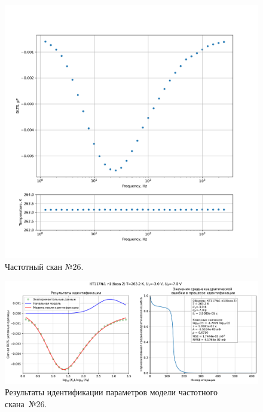 \begin{figure}[!ht]
    \centering
    \includegraphics[width=1\textwidth]{../plots/КТ117№1_п1(база 2)_2500Гц-1Гц_1пФ_-10С_-3В-7В_100мВ_20мкс_шаг_0,1.pdf}
    \caption{Частотный скан №26.}
    \label{pic:frequency_scan_26}
\end{figure}

\begin{figure}[!ht]
    \centering
    \includegraphics[width=1\textwidth]{../plots/КТ117№1_п1(база 2)_2500Гц-1Гц_1пФ_-10С_-3В-7В_100мВ_20мкс_шаг_0,1_model.pdf}
    \caption{Результаты идентификации параметров модели частотного скана~№26.}
    \label{pic:frequency_scan_model26}
\end{figure}

\pagebreak


